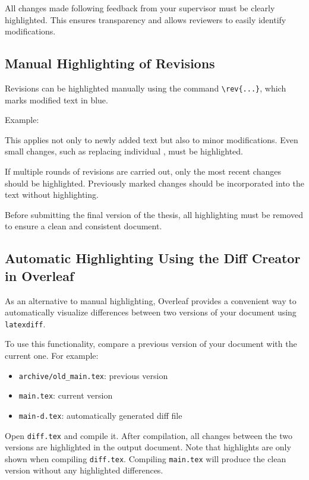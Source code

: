 \documentclass[a4paper, fleqn, headsepline, footsepline, 12pt, parskip=half]{scrartcl}
\begin{document}
All changes made following feedback from your supervisor must be clearly highlighted. This ensures transparency and allows reviewers to easily identify modifications.

\subsection{Manual Highlighting of Revisions}

Revisions can be highlighted manually using the command \verb|\rev{...}|, which marks modified text in blue.

Example:\\

This applies not only to newly added text but also to minor modifications. Even small changes, such as replacing individual , must be highlighted.

If multiple rounds of revisions are carried out, only the most recent changes should be highlighted. Previously marked changes should be incorporated into the text without highlighting.

Before submitting the final version of the thesis, all highlighting must be removed to ensure a clean and consistent document.

\subsection{Automatic Highlighting Using the Diff Creator in Overleaf}

As an alternative to manual highlighting, Overleaf provides a convenient way to automatically visualize differences between two versions of your document using \texttt{latexdiff}.

To use this functionality, compare a previous version of your document with the current one. For example:

\begin{itemize}
    \item \texttt{archive/old\_main.tex}: previous version
    \item \texttt{main.tex}: current version
    \item \texttt{main-d.tex}: automatically generated diff file
\end{itemize}

Open \texttt{diff.tex} and compile it. After compilation, all changes between the two versions are highlighted in the output document. Note that highlights are only shown when compiling \texttt{diff.tex}. Compiling \texttt{main.tex} will produce the clean version without any highlighted differences.
\end{document}

